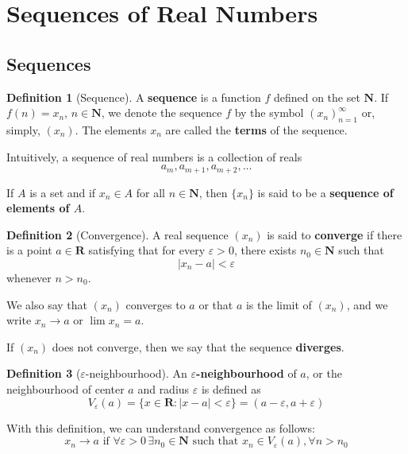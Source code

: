 \documentclass[tikz,12pt,a4paper]{article}
\theoremstyle{definition}
\newtheorem{definition}{Definition}[section]
\begin{document}
\newpage
\section{Sequences of Real Numbers}

\subsection{Sequences}

\begin{definition}[Sequence]
	A \textbf{sequence} is a function $f$ defined on the set $\textbf{N}$. If $f(n) = x_n$, $n \in \textbf{N}$, we denote the sequence $f$ by the symbol $(x_n)_{n=1}^\infty$ or, simply, $( x_n )$. The elements $x_n$ are called the \textbf{terms} of the sequence.
	
	Intuitively, a sequence of real numbers is a collection of reals \[a_m, a_{m+1}, a_{m+2}, \ldots\]
	
	If $A$ is a set and if $x_n \in A$ for all $n \in \textbf{N}$, then $\{ x_n \}$ is said to be a \textbf{sequence of elements of $A$}.
\end{definition}

\begin{definition}[Convergence]
	A real sequence $(x_n)$ is said to \textbf{converge} if there is a point $a \in \textbf{R}$ satisfying that for every $\varepsilon > 0$, there exists $n_0 \in \textbf{N}$ such that 
	\[ | x_n -a | < \varepsilon \]
	whenever $n > n_0$.
	
	We also say that $(x_n)$ converges to $a$ or that $a$ is the limit of $(x_n)$, and we write $x_n \longrightarrow a$ or $\lim x_n = a$.
	
	If $(x_n)$ does not converge, then we say that the sequence \textbf{diverges}.
\end{definition}

\begin{definition}[$\varepsilon$-neighbourhood]
	An \textbf{$\varepsilon$-neighbourhood} of $a$, or the neighbourhood of center $a$ and radius $\varepsilon$ is defined as
	\[ V_\varepsilon (a) = \{ x \in \textbf{R} : | x - a | < \varepsilon \} = (a-\varepsilon, a+ \varepsilon) \]
\end{definition}

With this definition, we can understand convergence as follows:
\[
	x_n \longrightarrow a \text{ if } \forall \varepsilon > 0 \, \exists n_0 \in \textbf{N} \text{ such that } x_n \in V_\varepsilon (a), \forall n > n_0
\]
\end{document}
